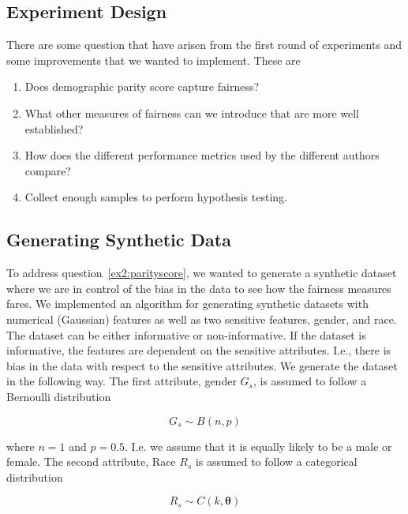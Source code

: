 \subsection{Experiment Design}

There are some question that have arisen from the first round of experiments and some improvements that we wanted to implement. These are

\begin{enumerate}
    \item Does demographic parity score capture fairness? \label{ex2:parityscore}
    \item What other measures of fairness can we introduce that are more well established? \label{ex2:fairnessmeasure}
    \item How does the different performance metrics used by the different authors compare?
    \item Collect enough samples to perform hypothesis testing.
\end{enumerate}

\subsection{Generating Synthetic Data}

To address question~\ref{ex2:parityscore}, we wanted to generate a synthetic dataset where we are in control of the bias in the data to see how the fairness measures fares. We implemented an algorithm for generating synthetic datasets with numerical (Gaussian) features as well as two sensitive features, gender, and race. The dataset can be either informative or non-informative. If the dataset is informative, the features are dependent on the sensitive attributes. I.e., there is bias in the data with respect to the sensitive attributes. We generate the dataset in the following way. The first attribute, gender $G_s$, is assumed to follow a Bernoulli distribution

\begin{equation*}
    G_s \sim B(n, p)
\end{equation*}

where $n = 1$ and $p = 0.5$. I.e. we assume that it is equally likely to be a male or female. The second attribute, Race $R_s$ is assumed to follow a categorical distribution 

\begin{equation*}
    R_s \sim C(k, \boldsymbol{\theta})
\end{equation*}

